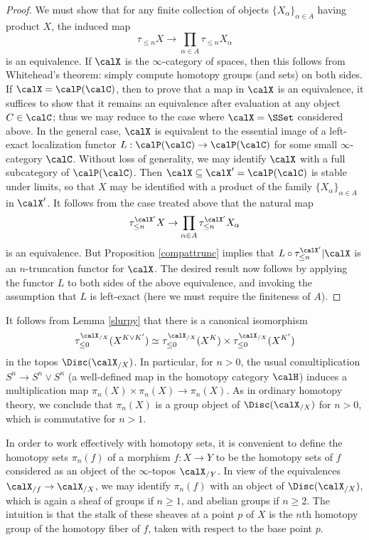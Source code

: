 \begin{proof}
We must show that for any finite collection of objects $\{ X_{\alpha} \}_{\alpha \in A}$
having product $X$, the induced map
$$ \tau_{\leq n} X \rightarrow \prod_{\alpha \in A} \tau_{\leq n} X_{\alpha} $$
is an equivalence. If $\calX$ is the $\infty$-category of spaces, then this follows from Whitehead's theorem: simply compute homotopy groups (and sets) on both sides. If $\calX = \calP(\calC)$, then to prove that a map in $\calX$ is an equivalence, it suffices to show that it remains an equivalence after evaluation at any object $C \in \calC$; thus we may reduce to the case where $\calX = \SSet$
considered above. In the general case, $\calX$ is equivalent to the essential image of a left-exact localization functor $L: \calP(\calC) \rightarrow \calP(\calC)$ for some small $\infty$-category $\calC$. Without loss of generality, we may identify $\calX$ with a full subcategory of $\calP(\calC)$. Then
$\calX \subseteq \calX' = \calP(\calC)$ is stable under limits, so that $X$ may be identified with
a product of the family $\{ X_{\alpha} \}_{\alpha \in A}$ in $\calX'$. It follows from the case treated above that the natural map
$$ \tau_{\leq n}^{\calX'} X \rightarrow \prod_{\alpha \in A} \tau_{\leq n}^{\calX'} X_{\alpha}$$
is an equivalence. But Proposition \ref{compattrunc} implies that $L \circ \tau_{\leq n}^{\calX'} | \calX$ is an $n$-truncation functor for $\calX$. The desired result now follows by applying the functor $L$ to both sides of the above equivalence, and invoking the assumption that $L$ is left-exact (here we must require the finiteness of $A$).
\end{proof}

It follows from Lemma \ref{slurpy} that there is a canonical isomorphism
$$\tau^{\calX_{/X}}_{\leq 0} (X^{K \vee K'}) \simeq \tau^{\calX_{/X}}_{\leq 0}(X^K) \times \tau^{\calX_{/X}}_{\leq 0}(X^{K'})$$ in the topos $\Disc(\calX_{/X})$. 
In particular, for $n > 0$, the usual comultiplication $S^n \rightarrow S^n \vee S^n$
(a well-defined map in the homotopy category $\calH$)
induces a multiplication map $\pi_n(X) \times \pi_n(X) \rightarrow \pi_n(X)$. As in ordinary homotopy theory, we conclude that $\pi_n(X)$ is a group object of $\Disc(\calX_{/X})$ for $n > 0$, which is commutative for $n > 1$.

In order to work effectively with homotopy sets, it is convenient
to define the homotopy sets $\pi_n(f)$ of a morphism $f: X
\rightarrow Y$ to be the homotopy sets of $f$ considered as an object
of the $\infty$-topos $\calX_{/Y}$. In view of the equivalences
$\calX_{/f} \rightarrow \calX_{/X}$, we may identify $\pi_n(f)$ with an object
of $\Disc(\calX_{/X})$, which is again a sheaf of groups if
$n \geq 1$, and abelian groups if $n\geq 2$.
The intuition is that the stalk of these sheaves at a point $p$ of $X$ is the $n$th homotopy group of the homotopy fiber of $f$, taken with respect to the base point $p$.

